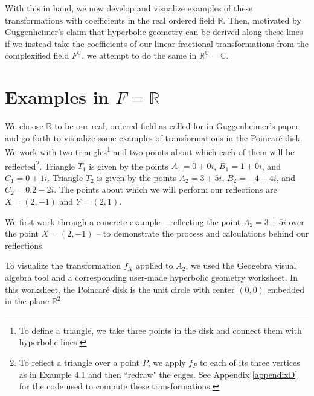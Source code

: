 \documentclass[12pt]{article}
\newcommand{\R}{\mathbb{R}}
\newcommand{\C}{\mathbb{C}}
\newcommand{\fc}{F^{\C}}
\newcommand{\poincare}{Poincar\'{e} }
\theoremstyle{plain}
\theoremstyle{definition}
\begin{document}
With this in hand, we now develop and visualize examples of these transformations with coefficients in the real ordered field $\R$. Then, motivated by Guggenheimer's claim that hyperbolic geometry can be derived along these lines if we instead take the coefficients of our linear fractional transformations from the complexified field $\fc$, we attempt to do the same in $\R^{\C} = \C$. 



\section{Examples in $F = \R$}

\hspace{10mm} We choose $\R$ to be our real, ordered field as called for in Guggenheimer's paper and go forth to visualize some examples of transformations in the \poincare disk. We work with two triangles\footnote{To define a triangle, we take three points in the disk and connect them with hyperbolic lines.} and two points about which each of them will be reflected\footnote{To reflect a triangle over a point $P$, we apply $f_P$ to each of its three vertices as in Example 4.1 and then ``redraw" the edges. See Appendix \ref{appendixD} for the code used to compute these transformations.}. Triangle $T_1$ is given by the points $A_1 = 0 + 0i$, $B_1 = 1 + 0i$, and $C_1 = 0 + 1i$. Triangle $T_2$ is given by the points $A_2 = 3 + 5i$, $B_2 = -4 + 4i$, and $C_2 = 0.2 - 2i$. The points about which we will perform our reflections are $X = (2, -1)$ and $Y = (2, 1)$.

We first work through a concrete example -- reflecting the point $A_2 = 3+5i$ over the point $X = (2, -1)$ -- to demonstrate the process and calculations behind our reflections.

To visualize the transformation $f_X$ applied to $A_2$, we used the Geogebra visual algebra tool\cite{geogebra_software} and a corresponding user-made hyperbolic geometry worksheet\cite{hyperbolic_worksheet}. In this worksheet, the \poincare disk is the unit circle with center $(0,0)$ embedded in the plane $\R^2$. 
\end{document}
